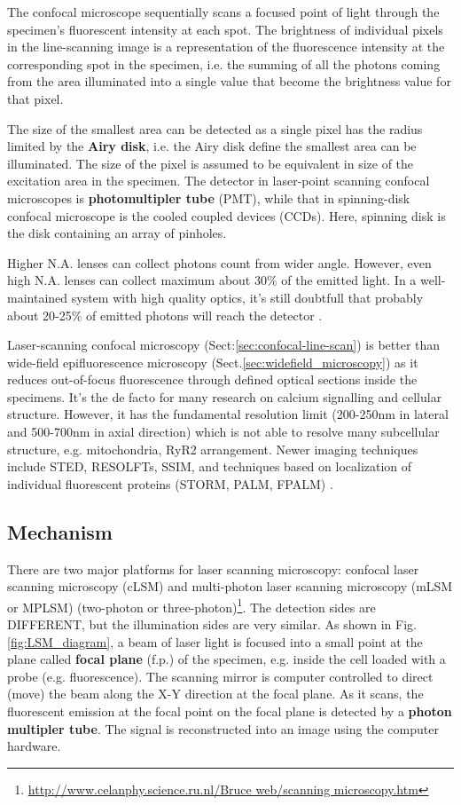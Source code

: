 The confocal microscope sequentially scans a focused point of light through the
specimen's fluorescent intensity at each spot. The brightness of individual
pixels in the line-scanning image is a representation of the fluorescence
intensity at the corresponding spot in the specimen, i.e. the summing of all the
photons coming from the area illuminated into a single value that become the
brightness value for that pixel.

The size of the smallest area can be detected as a single pixel has the radius
limited by the {\bf Airy disk}, i.e. the Airy disk define the smallest area can
be illuminated. The size of the pixel is assumed to be equivalent in size of the
excitation area in the specimen. The detector in laser-point scanning confocal
microscopes is {\bf photomultipler tube} (PMT), while that in spinning-disk
confocal microscope is the cooled coupled devices (CCDs). Here, spinning disk is
the disk containing an array of pinholes.

Higher N.A. lenses can collect photons count from wider angle. However, even
high N.A. lenses can collect maximum about 30\% of the emitted light. In a
well-maintained system with high quality optics, it's still doubtfull that
probably about 20-25\% of emitted photons will reach the detector
\citep{jerome2011dic}.

Laser-scanning confocal microscopy (Sect:\ref{sec:confocal-line-scan}) is better
than wide-field epifluorescence microscopy (Sect.\ref{sec:widefield_microscopy})
as it reduces out-of-focus fluorescence through defined optical sections inside
the specimens. It's the de facto for many research on calcium signalling and
cellular structure. However, it has the fundamental resolution limit (200-250nm
in lateral and 500-700nm in axial direction) \citep{Kohl2013} which is not able
to resolve many subcellular structure, e.g. mitochondria, RyR2 arrangement.
Newer imaging techniques include STED, RESOLFTs, SSIM, and techniques based on
localization of individual fluorescent proteins (STORM, PALM, FPALM)
\citep{Huang2009}.




\subsection{Mechanism}
\label{sec:mechanism-laser-scanning-confocal-microscopy}

There are two major platforms for laser scanning microscopy: confocal laser
scanning microscopy (cLSM) and multi-photon laser scanning microscopy (mLSM or
MPLSM) (two-photon or
three-photon)\footnote{\url{http://www.celanphy.science.ru.nl/Bruce web/scanning
microscopy.htm}}. The detection sides are DIFFERENT, but the illumination sides
are very similar. As shown in Fig.\ref{fig:LSM_diagram}, a beam of laser light
is focused into a small point at the plane called {\bf focal plane} (f.p.) of
the specimen, e.g. inside the cell loaded with a probe (e.g. fluorescence). The
scanning mirror is computer controlled to direct (move) the beam along the X-Y
direction at the focal plane. As it scans, the fluorescent emission at the focal
point on the focal plane  is detected by a {\bf photon multipler tube}. The
signal is reconstructed into an image using the computer hardware.

